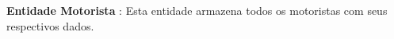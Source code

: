 







\textbf{Entidade Motorista} : Esta entidade armazena todos os motoristas com seus respectivos dados.

